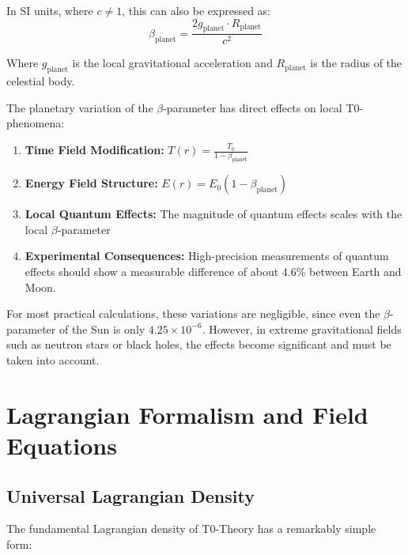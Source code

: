 \documentclass[12pt,a4paper]{article}
\theoremstyle{definition}
\begin{document}
	In SI units, where $c \neq 1$, this can also be expressed as:
	\begin{equation}
		\beta_{\text{planet}} = \frac{2g_{\text{planet}} \cdot R_{\text{planet}}}{c^2}
	\end{equation}
	
	Where $g_{\text{planet}}$ is the local gravitational acceleration and $R_{\text{planet}}$ is the radius of the celestial body.
	
	
	
	\begin{wichtig}
		The planetary variation of the $\beta$-parameter has direct effects on local T0-phenomena:
		
		\begin{enumerate}
			\item \textbf{Time Field Modification:} $T(r) = \frac{T_0}{1 - \beta_{\text{planet}}}$
			
			\item \textbf{Energy Field Structure:} $E(r) = E_0(1 - \beta_{\text{planet}})$
			
			\item \textbf{Local Quantum Effects:} The magnitude of quantum effects scales with the local $\beta$-parameter
			
			\item \textbf{Experimental Consequences:} High-precision measurements of quantum effects should show a measurable difference of about 4.6\% between Earth and Moon.
		\end{enumerate}
		
		For most practical calculations, these variations are negligible, since even the $\beta$-parameter of the Sun is only $4.25 \times 10^{-6}$. However, in extreme gravitational fields such as neutron stars or black holes, the effects become significant and must be taken into account.
	\end{wichtig}
	
	\section{Lagrangian Formalism and Field Equations}
	
	\subsection{Universal Lagrangian Density}
	
	The fundamental Lagrangian density of T0-Theory has a remarkably simple form:
	
\end{document}
